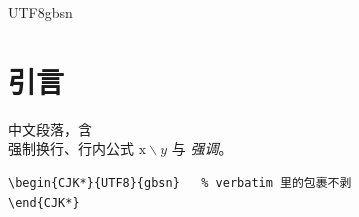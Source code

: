 \documentclass{article}
\newcommand{\g}[1]{\mathrm{#1}}
\begin{document}
\begin{CJK*}{UTF8}{gbsn}

\section{引言}
中文段落，含 \\ 强制换行、行内公式 $\g{x}\backslash y$ 与 \emph{强调}。

\begin{verbatim}
\begin{CJK*}{UTF8}{gbsn}   % verbatim 里的包裹不剥
\end{CJK*}
\end{verbatim}

\end{CJK*}
\end{document}
